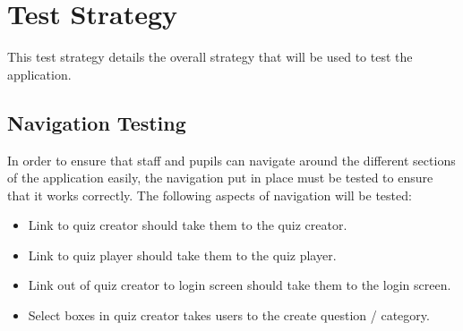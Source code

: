 \section{Test Strategy}
This test strategy details the overall strategy that will be used to test the application.

\subsection{Navigation Testing}
In order to ensure that staff and pupils can navigate around the different sections of the application easily, the navigation put in place must be tested to ensure that it works correctly. The following aspects of navigation will be tested:

\begin{itemize}
\item Link to quiz creator should take them to the quiz creator.
\item Link to quiz player should take them to the quiz player.
\item Link out of quiz creator to login screen should take them to the login screen.

\item Select boxes in quiz creator takes users to the create question / category.
\end{itemize}

